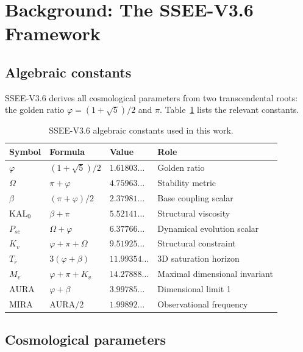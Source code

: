 \documentclass[12pt,a4paper]{article}
\begin{document}
\section{Background: The SSEE-V3.6 Framework}
\label{sec:framework}

\subsection{Algebraic constants}

SSEE-V3.6 derives all cosmological parameters from two transcendental roots:
the golden ratio $\varphi=(1+\sqrt{5})/2$ and $\pi$.
Table~\ref{tab:constants} lists the relevant constants.

\begin{table}[ht]
\centering
\caption{SSEE-V3.6 algebraic constants used in this work.}
\label{tab:constants}
\begin{tabular}{llll}
\toprule
Symbol & Formula & Value & Role \\
\midrule
$\varphi$ & $(1+\sqrt{5})/2$ & $1.61803\ldots$ & Golden ratio \\
$\Omega$ & $\pi+\varphi$ & $4.75963\ldots$ & Stability metric \\
$\beta$   & $(\pi+\varphi)/2$ & $2.37981\ldots$ & Base coupling scalar \\
$\mathrm{KAL}_0$ & $\beta+\pi$ & $5.52141\ldots$ & Structural viscosity \\
$P_{sc}$  & $\Omega+\varphi$ & $6.37766\ldots$ & Dynamical evolution scalar \\
$K_v$     & $\varphi+\pi+\Omega$ & $9.51925\ldots$ & Structural constraint \\
$T_r$     & $3(\varphi+\beta)$ & $11.99354\ldots$ & 3D saturation horizon \\
$M_v$     & $\varphi+\pi+K_v$ & $14.27888\ldots$ & Maximal dimensional invariant \\
\midrule
$\mathrm{AURA}$ & $\varphi+\beta$ & $3.99785\ldots$ & Dimensional limit 1 \\
$\mathrm{MIRA}$ & $\mathrm{AURA}/2$ & $1.99892\ldots$ & Observational frequency \\
\bottomrule
\end{tabular}
\end{table}

\subsection{Cosmological parameters}
\end{document}
